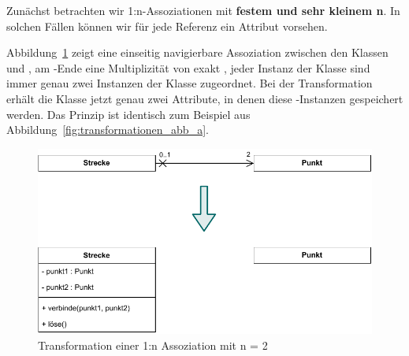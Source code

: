 \pagebreak %


\vspace{2mm} %

Zunächst betrachten wir 1:n-Assoziationen mit \textbf{festem und sehr kleinem n}. In solchen Fällen können wir für jede Referenz ein Attribut vorsehen.

\vspace{2mm} %

Abbildung~\ref{fig:transformationen_abb_c} zeigt eine einseitig navigierbare Assoziation zwischen den Klassen  und , am -Ende eine Multiplizität von exakt , \dasHeisst jeder Instanz der Klasse  sind immer genau zwei Instanzen der Klasse  zugeordnet. Bei der Transformation erhält die Klasse  jetzt genau zwei Attribute, in denen diese -Instanzen gespeichert werden. Das Prinzip ist identisch zum Beispiel aus Abbildung~\ref{fig:transformationen_abb_a}.

\begin{figure}[h!]
	\centering
	\includegraphics[scale=1.0]{Bilder/Kapitel-9/transformationen_abb_c.pdf}
	\vspace{\baselineskip} %
	\caption{Transformation einer 1:n Assoziation mit n = 2}
	\label{fig:transformationen_abb_c}
\end{figure}

\pagebreak %

\minisec{~~~} %
\vspace{2mm} %


